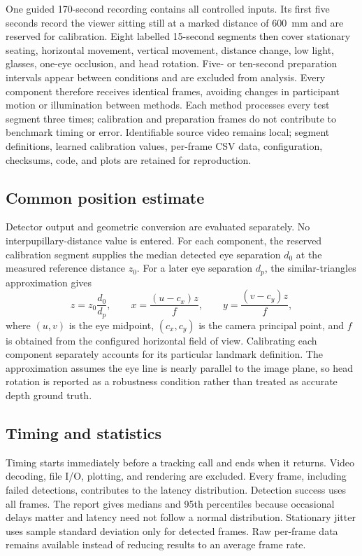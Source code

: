 \documentclass[9pt,a4paper,twocolumn]{article}
\begin{document}
One guided 170-second recording contains all controlled inputs. Its first five seconds record the viewer sitting still at a marked distance of 600~mm and are reserved for calibration. Eight labelled 15-second segments then cover stationary seating, horizontal movement, vertical movement, distance change, low light, glasses, one-eye occlusion, and head rotation. Five- or ten-second preparation intervals appear between conditions and are excluded from analysis. Every component therefore receives identical frames, avoiding changes in participant motion or illumination between methods. Each method processes every test segment three times; calibration and preparation frames do not contribute to benchmark timing or error. Identifiable source video remains local; segment definitions, learned calibration values, per-frame CSV data, configuration, checksums, code, and plots are retained for reproduction.

\subsection{Common position estimate}

Detector output and geometric conversion are evaluated separately. No interpupillary-distance value is entered. For each component, the reserved calibration segment supplies the median detected eye separation $d_0$ at the measured reference distance $z_0$. For a later eye separation $d_p$, the similar-triangles approximation gives
\[
z=z_0\frac{d_0}{d_p},\qquad
x=\frac{(u-c_x)z}{f},\qquad
y=\frac{(v-c_y)z}{f},
\]
where $(u,v)$ is the eye midpoint, $(c_x,c_y)$ is the camera principal point, and $f$ is obtained from the configured horizontal field of view. Calibrating each component separately accounts for its particular landmark definition. The approximation assumes the eye line is nearly parallel to the image plane, so head rotation is reported as a robustness condition rather than treated as accurate depth ground truth.

\subsection{Timing and statistics}

Timing starts immediately before a tracking call and ends when it returns. Video decoding, file I/O, plotting, and rendering are excluded. Every frame, including failed detections, contributes to the latency distribution. Detection success uses all frames. The report gives medians and 95th percentiles because occasional delays matter and latency need not follow a normal distribution. Stationary jitter uses sample standard deviation only for detected frames. Raw per-frame data remains available instead of reducing results to an average frame rate.
\end{document}
